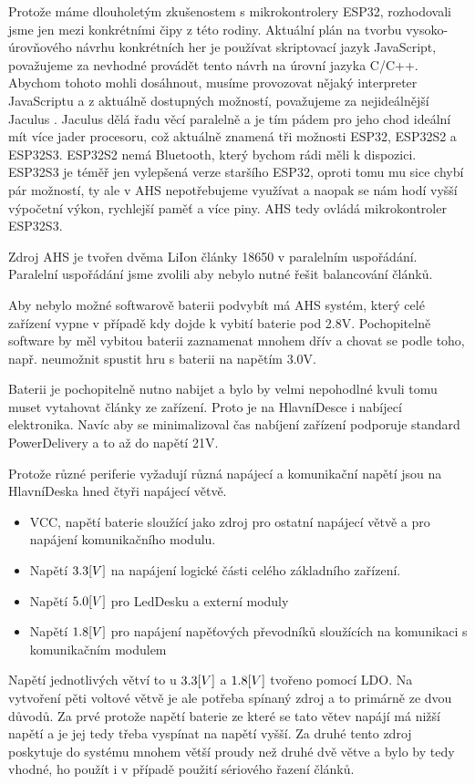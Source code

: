 Protože máme dlouholetým zkušenostem s mikrokontrolery ESP32, rozhodovali jsme jen mezi konkrétními čipy z této rodiny.
Aktuální plán na tvorbu vysoko-úrovňového návrhu konkrétních her je používat skriptovací jazyk JavaScript, považujeme za nevhodné provádět tento návrh na úrovní jazyka C/C++.
Abychom tohoto mohli dosáhnout, musíme provozovat nějaký interpreter JavaScriptu a z aktuálně dostupných možností, považujeme za nejideálnější Jaculus \cite{Jaculus}.
Jaculus dělá řadu věcí paralelně a je tím pádem pro jeho chod ideální mít více jader procesoru, což aktuálně znamená tři možnosti ESP32, ESP32S2 a ESP32S3.
ESP32S2 nemá Bluetooth, který bychom rádi měli k dispozici.
ESP32S3 je téměř jen vylepšená verze staršího ESP32, oproti tomu mu sice chybí pár možností, ty ale v AHS nepotřebujeme využívat a naopak se nám hodí vyšší výpočetní výkon, rychlejší paměť a více piny.
AHS tedy ovládá mikrokontroler ESP32S3.

Zdroj AHS je tvořen dvěma LiIon články 18650 v paralelním uspořádání.
Paralelní uspořádání jsme zvolili aby nebylo nutné řešit balancování článků.

Aby nebylo možné softwarově baterii podvybít má AHS systém, který celé zařízení vypne v případě kdy dojde k vybití baterie pod 2.8V.
Pochopitelně software by měl vybitou baterii zaznamenat mnohem dřív a chovat se podle toho, např. neumožnit spustit hru s baterii na napětím 3.0V.

Baterii je pochopitelně nutno nabijet a bylo by velmi nepohodlné kvuli tomu muset vytahovat články ze zařízení.
Proto je na HlavníDesce i nabíjecí elektronika.
Navíc aby se minimalizoval čas nabíjení zařízení podporuje standard PowerDelivery a to až do napětí 21V.

Protože různé periferie vyžadují různá napájecí a komunikační napětí jsou na HlavníDeska hned čtyři napájecí větvě.
\begin{itemize}
    \item VCC, napětí baterie sloužící jako zdroj pro ostatní napájecí větvě a pro napájení komunikačního modulu. 
    \item Napětí \(3.3\-[V]\) na napájení logické části celého základního zařízení.
    \item Napětí \(5.0\-[V]\) pro LedDesku a externí moduly
    \item Napětí \(1.8\-[V]\) pro napájení napěťových převodníků sloužících na komunikaci s komunikačním modulem 
\end{itemize}
Napětí jednotlivých větví to u \(3.3\-[V]\) a \(1.8\-[V]\) tvořeno pomocí LDO.
Na vytvoření pěti voltové větvě je ale potřeba spínaný zdroj a to primárně ze dvou důvodů.
Za prvé protože napětí baterie ze které se tato větev napájí má nižší napětí a je jej tedy třeba vyspínat na napětí vyšší.
Za druhé tento zdroj poskytuje do systému mnohem větší proudy než druhé dvě větve a bylo by tedy vhodné, ho použít i v případě použití sériového řazení článků.

